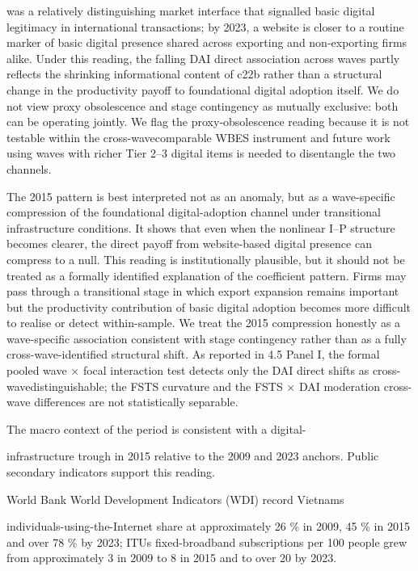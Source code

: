 \documentclass[12pt,a4paper]{article}
\begin{document}
was a relatively distinguishing market interface that signalled basic
digital legitimacy in international transactions; by 2023, a website is
closer to a routine marker of basic digital presence shared across
exporting and non-exporting firms alike. Under this reading, the falling
DAI direct association across waves partly reflects the shrinking
informational content of c22b rather than a structural change in the
productivity payoff to foundational digital adoption itself. We do not
view proxy obsolescence and stage contingency as mutually exclusive:
both can be operating jointly. We flag the proxy-obsolescence reading
because it is not testable within the cross-wavecomparable WBES
instrument and future work using waves with richer Tier 2--3 digital
items is needed to disentangle the two channels.

The 2015 pattern is best interpreted not as an anomaly, but as a
wave-specific compression of the foundational digital-adoption channel
under transitional infrastructure conditions. It shows that even when
the nonlinear I--P structure becomes clearer, the direct payoff from
website-based digital presence can compress to a null. This reading is
institutionally plausible, but it should not be treated as a formally
identified explanation of the coefficient pattern. Firms may pass
through a transitional stage in which export expansion remains important
but the productivity contribution of basic digital adoption becomes more
difficult to realise or detect within-sample. We treat the 2015
compression honestly as a wave-specific association consistent with
stage contingency rather than as a fully cross-wave-identified
structural shift. As reported in 4.5 Panel I, the formal pooled wave ×
focal interaction test detects only the DAI direct shifts as
cross-wavedistinguishable; the FSTS curvature and the FSTS × DAI
moderation cross-wave differences are not statistically separable.

The macro context of the period is consistent with a digital-

infrastructure trough in 2015 relative to the 2009 and 2023 anchors.
Public secondary indicators support this reading.

World Bank World Development Indicators (WDI) record
Vietnam\textquotesingle s

individuals-using-the-Internet share at approximately 26 \% in 2009, 45
\% in 2015 and over 78 \% by 2023; ITU\textquotesingle s fixed-broadband
subscriptions per 100 people grew from approximately 3 in 2009 to 8 in
2015 and to over 20 by 2023.
\end{document}
